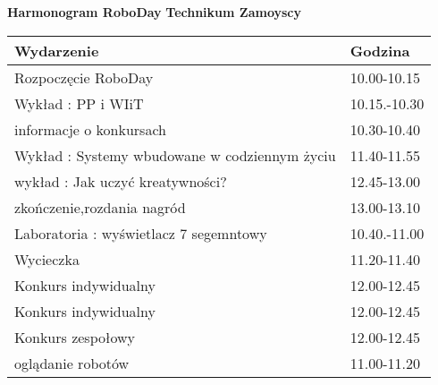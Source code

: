 \documentclass{article}
\begin{document}
\begin{center}
\Large\textbf{Harmonogram RoboDay}
\large\textbf{Technikum Zamoyscy}
\end{center}
\vspace{1cm}
\begin{center}
\begin{tabular}{|l|l|}
\hline
\textbf{Wydarzenie} & \textbf{Godzina} \\
\hline
Rozpoczęcie RoboDay & 10.00-10.15 \\
\hline
Wykład : PP i WIiT & 10.15.-10.30 \\
\hline
informacje o konkursach & 10.30-10.40 \\
\hline
Wykład : Systemy wbudowane w codziennym życiu & 11.40-11.55 \\
\hline
wykład : Jak uczyć kreatywności? & 12.45-13.00 \\
\hline
zkończenie,rozdania nagród & 13.00-13.10 \\
\hline
Laboratoria : wyświetlacz 7 segemntowy & 10.40.-11.00 \\
\hline
Wycieczka  & 11.20-11.40 \\
\hline
Konkurs indywidualny & 12.00-12.45 \\
\hline
Konkurs indywidualny & 12.00-12.45 \\
\hline
Konkurs zespołowy & 12.00-12.45 \\
\hline
oglądanie robotów & 11.00-11.20 \\
\hline
\end{tabular}
\end{center}
\end{document}
